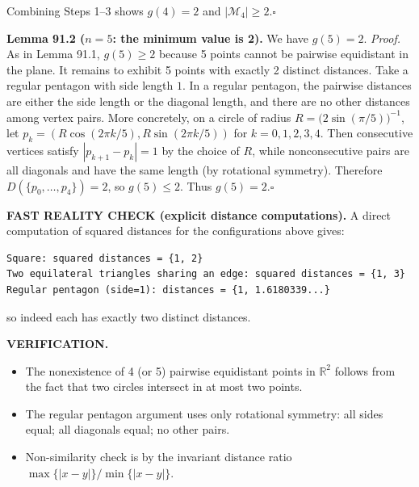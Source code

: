 Combining Steps 1--3 shows $g(4)=2$ and $|\mathcal{M}_4|\ge 2$.\hfill $\square$

\smallskip
\noindent\textbf{Lemma 91.2 ($n=5$: the minimum value is 2).}
We have $g(5)=2$.
\textit{Proof.}
As in Lemma 91.1, $g(5)\ge 2$ because 5 points cannot be pairwise equidistant in the plane.
It remains to exhibit 5 points with exactly 2 distinct distances.
Take a regular pentagon with side length $1$. In a regular pentagon, the pairwise distances are either the side length or the diagonal length, and there are no other distances among vertex pairs.
More concretely, on a circle of radius $R=\bigl(2\sin(\pi/5)\bigr)^{-1}$, let $p_k=(R\cos(2\pi k/5),R\sin(2\pi k/5))$ for $k=0,1,2,3,4$. Then consecutive vertices satisfy $|p_{k+1}-p_k|=1$ by the choice of $R$, while nonconsecutive pairs are all diagonals and have the same length (by rotational symmetry). Therefore $D(\{p_0,\dots,p_4\})=2$, so $g(5)\le 2$.
Thus $g(5)=2$.\hfill $\square$

\smallskip
\noindent\textbf{FAST REALITY CHECK (explicit distance computations).}
A direct computation of squared distances for the configurations above gives:
\begin{verbatim}
Square: squared distances = {1, 2}
Two equilateral triangles sharing an edge: squared distances = {1, 3}
Regular pentagon (side=1): distances = {1, 1.6180339...}
\end{verbatim}
so indeed each has exactly two distinct distances.

\medskip
\noindent\textbf{VERIFICATION.}
\begin{itemize}
\item The nonexistence of 4 (or 5) pairwise equidistant points in $\mathbb{R}^2$ follows from the fact that two circles intersect in at most two points.
\item The regular pentagon argument uses only rotational symmetry: all sides equal; all diagonals equal; no other pairs.
\item Non-similarity check is by the invariant distance ratio $\max\{|x-y|\}/\min\{|x-y|\}$.
\end{itemize}

